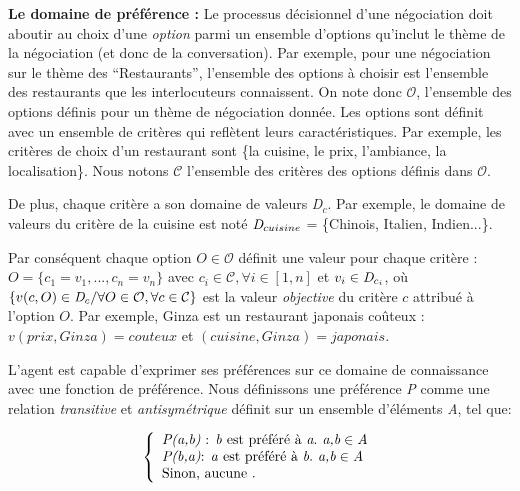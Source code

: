 \documentclass [french]{sig-alternate-05-2015}
\begin{document}
\par \textbf{Le domaine de préférence :}
Le processus décisionnel d'une négociation  doit aboutir au choix d'une \emph{option} parmi un ensemble d'options qu'inclut le thème de la négociation (et donc de la conversation). Par exemple, pour une négociation sur le thème des ``Restaurants'', l'ensemble des options à choisir est l'ensemble des restaurants que les interlocuteurs connaissent.
 On note donc $\mathcal{O}$, l'ensemble des options définis pour un thème de négociation donnée. Les options sont définit avec un ensemble de critères qui reflètent leurs caractéristiques. Par exemple, les critères de choix d'un restaurant sont \{la cuisine, le prix, l'ambiance, la localisation\}. Nous notons $\mathcal{C}$ l'ensemble des critères des options définis dans $\mathcal{O}$.
 \par De plus, chaque critère a son domaine de valeurs \emph{D$_c$}. Par exemple, le domaine de valeurs du critère de la cuisine est noté $\emph{D}_{cuisine}$ = \{Chinois, Italien, Indien...\}.

\par Par conséquent chaque option $O\in \mathcal{O}$ définit une valeur pour chaque critère : 
$O = \{c_1=v_1,..., c_n=v_n\}$ avec $c_i \in \mathcal{C}, \forall i \in [1,n]$ et $v_i\in \emph{D}_{c_i}$, où $\{v(c,O) \in \emph{D}_{c} / \forall O \in \mathcal{O}, \forall c \in \mathcal{C}\}$ est la valeur \emph{objective} du critère $c$ attribué à l'option $O$. 
Par exemple, Ginza est un restaurant japonais coûteux : $v(prix, Ginza) = couteux $ et $(cuisine, Ginza) = japonais$. 


\par L'agent est capable d'exprimer ses préférences sur ce domaine de connaissance avec une fonction de préférence. Nous définissons une préférence \emph{P} comme une relation \emph{transitive} et \emph{antisymétrique} définit sur un ensemble d'éléments \emph{A}, tel que:

\[ \left \{
\begin{array}{l}
\emph{P(a,b)} $ : \emph{b}  est préféré à $\emph{a}. \emph{ a,b} \in \emph{A}\\
\emph{P(b,a)} $:  \emph{a} est préféré à  $\emph{b}. \emph{ a,b} \in \emph{A}\\
$Sinon, aucune . $\\
\end{array}
\right .\]
\end{document}
